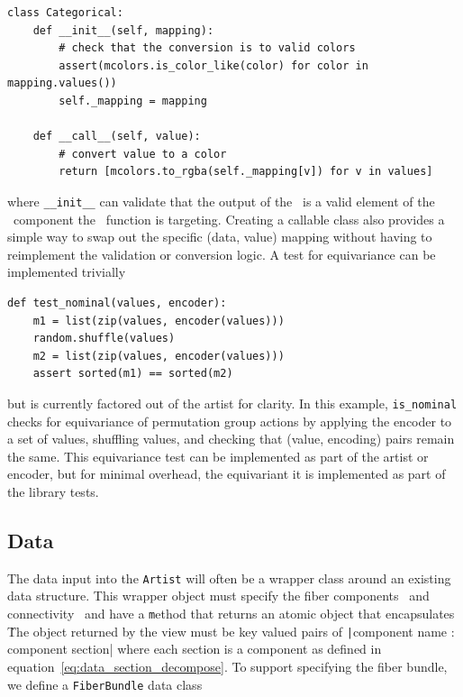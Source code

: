 \documentclass[../main.tex]{subfiles}
\begin{document}
\begin{verbatim}
class Categorical:
    def __init__(self, mapping):
        # check that the conversion is to valid colors
        assert(mcolors.is_color_like(color) for color in mapping.values())
        self._mapping = mapping

    def __call__(self, value):
        # convert value to a color
        return [mcolors.to_rgba(self._mapping[v]) for v in values]
\end{verbatim}

where \texttt{__init__} can validate that the output of the \vchannel\ is a valid element of the \vfiber\ component the \vchannel\ function is targeting. Creating a callable class also provides a simple way to swap out the specific (data, value) mapping without having to reimplement the validation or conversion logic. A test for equivariance can be implemented trivially
\begin{verbatim}
def test_nominal(values, encoder):
    m1 = list(zip(values, encoder(values)))
    random.shuffle(values)
    m2 = list(zip(values, encoder(values)))
    assert sorted(m1) == sorted(m2)
\end{verbatim}
but is currently factored out of the artist for clarity. In this example, \texttt{is_nominal} checks for equivariance of permutation group actions by applying the encoder to a set of values, shuffling values, and checking that (value, encoding) pairs remain the same. This equivariance test can be implemented as part of the artist or encoder, but for minimal overhead, the equivariant it is implemented as part of the library tests.

\subsection{Data \dtotal}
\label{sec:code_data}
The data input into the \texttt{Artist} will often be a wrapper class around an existing data structure. This wrapper object must specify the fiber components \dfiber\ and connectivity \dbase\ and have a \texttt method that returns an atomic object that encapsulates \dsection\. The object returned by the view must be key valued pairs of \texttt|{component name : component section}| where each section is a component as defined in equation~\ref{eq:data_section_decompose}. To support specifying the fiber bundle, we define a \texttt{FiberBundle} data class\cite{DataclassesDataClasses}
\end{document}
